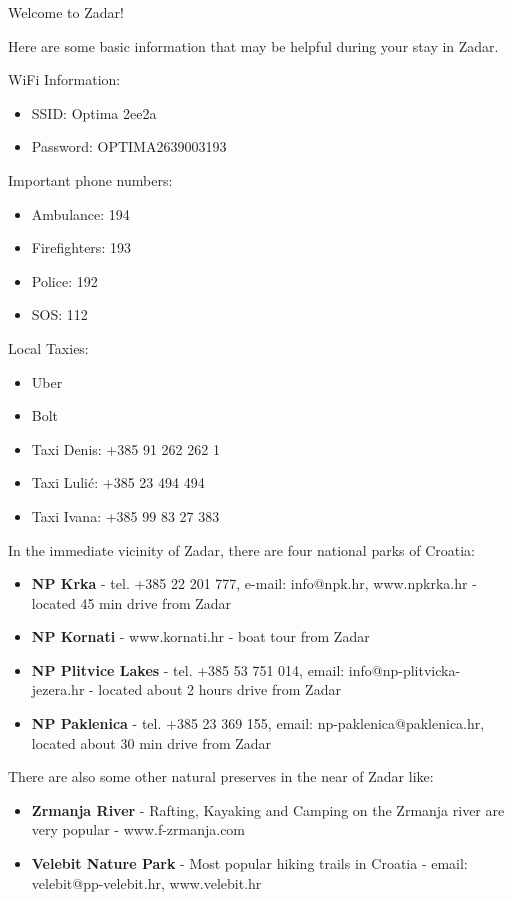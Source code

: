 \documentclass[12pt]{article}
\begin{document}
\begin{center}
\Huge
Welcome to Zadar!
\end{center}
\uwave{\hspace{15cm}}

\large
\vspace{0.5cm}
\noindent
Here are some basic information that may be helpful during your stay in Zadar.


\vspace{0.5cm}
\noindent
WiFi Information:
\begin{itemize}
\item SSID: Optima 2ee2a
\item Password: OPTIMA2639003193
\end{itemize}



\vspace{0.5cm}

\noindent
\large
Important phone numbers:
\begin{itemize}
\large
\item Ambulance: 194
\item Firefighters: 193
\item Police: 192
\item SOS: 112
\end{itemize}

\vspace{0.5cm}
\noindent
\large
Local Taxies:
\begin{itemize}
\large
\item Uber
\item Bolt
\item Taxi Denis: +385 91 262 262 1
\item Taxi Lulić: +385 23 494 494
\item Taxi Ivana: +385 99 83 27 383
\end{itemize}
\newpage
\noindent
In the immediate vicinity of Zadar, there are four national parks of Croatia:
\begin{itemize}
\large
\item \textbf{NP Krka} - tel. +385 22 201 777, e-mail: info@npk.hr, www.npkrka.hr - located 45 min drive from Zadar
\item \textbf{NP Kornati} - www.kornati.hr - boat tour from Zadar
\item \textbf{NP Plitvice Lakes} - tel. +385 53 751 014, email: info@np-plitvicka-jezera.hr - located about 2 hours drive from Zadar
\item \textbf{NP Paklenica} - tel. +385 23 369 155, email: np-paklenica@paklenica.hr,  located about 30 min drive from Zadar 
\end{itemize}
\noindent
There are also some other natural preserves in the near of Zadar like:
\begin{itemize}
\large
\item \textbf{Zrmanja River} - Rafting, Kayaking and Camping on the Zrmanja river are very popular - www.f-zrmanja.com
\item \textbf{Velebit Nature Park} - Most popular hiking trails in Croatia - email: velebit@pp-velebit.hr, www.velebit.hr
\end{itemize}
\end{document}

